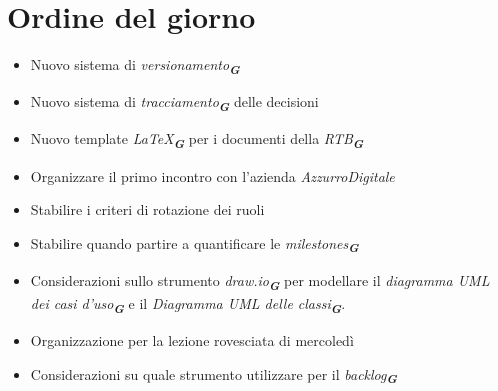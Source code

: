 

\section{Ordine del giorno}

\begin{itemize}
    \item Nuovo sistema di \emph{versionamento}\textsubscript{\textit{\textbf{G}}}
    \item Nuovo sistema di \emph{tracciamento}\textsubscript{\textit{\textbf{G}}} delle decisioni
    \item Nuovo template \emph{LaTeX}\textsubscript{\textit{\textbf{G}}} per i documenti della \emph{RTB}\textsubscript{\textit{\textbf{G}}}
    \item Organizzare il primo incontro con l'azienda \emph{AzzurroDigitale}
    \item Stabilire i criteri di rotazione dei ruoli
    \item Stabilire quando partire a quantificare le \emph{milestones}\textsubscript{\textit{\textbf{G}}}
    \item Considerazioni sullo strumento \emph{draw.io}\textsubscript{\textit{\textbf{G}}} per modellare il \emph{diagramma UML dei casi d'uso}\textsubscript{\textit{\textbf{G}}}
    e il \emph{Diagramma UML delle classi}\textsubscript{\textit{\textbf{G}}}.
    \item Organizzazione per la lezione rovesciata di mercoledì 
    \item Considerazioni su quale strumento utilizzare per il \emph{backlog}\textsubscript{\textit{\textbf{G}}}
\end{itemize}
